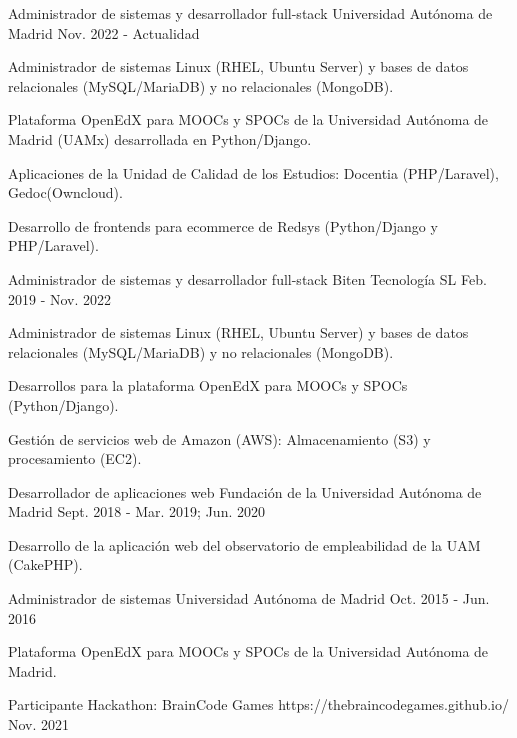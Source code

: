 \begin{cventries}
  \cventry
    {Administrador de sistemas y desarrollador full-stack} %
    {Universidad Autónoma de Madrid} %
    {} %
    {Nov. 2022 - Actualidad} %
    {
      \begin{cvitems} %
        \item{Administrador de sistemas Linux (RHEL, Ubuntu Server) y bases de datos relacionales (MySQL/MariaDB) y no relacionales (MongoDB).}
		\item{Plataforma OpenEdX para MOOCs y SPOCs de la Universidad Autónoma de Madrid (UAMx) desarrollada en Python/Django.}
		\item{Aplicaciones de la Unidad de Calidad de los Estudios: Docentia (PHP/Laravel), Gedoc(Owncloud).}
		\item{Desarrollo de frontends para ecommerce de Redsys (Python/Django y PHP/Laravel).}
      \end{cvitems}
    }

  \cventry
    {Administrador de sistemas y desarrollador full-stack} %
    {Biten Tecnología SL} %
    {} %
    {Feb. 2019 - Nov. 2022} %
    {
    \begin{cvitems}
      \item{Administrador de sistemas Linux (RHEL, Ubuntu Server) y bases de datos relacionales (MySQL/MariaDB) y no relacionales (MongoDB).}
		\item{Desarrollos para la plataforma OpenEdX para MOOCs y SPOCs (Python/Django).}
		\item{Gestión de servicios web de Amazon (AWS): Almacenamiento (S3) y procesamiento (EC2).}
	\end{cvitems}
	}

  \cventry
    {Desarrollador de aplicaciones web} %
    {Fundación de la Universidad Autónoma de Madrid} %
    {} %
    {Sept. 2018 - Mar. 2019; Jun. 2020} %
    {
      \begin{cvitems} %
        \item {Desarrollo de la aplicación web del observatorio de empleabilidad de la UAM (CakePHP).}
      \end{cvitems}
    }

  \cventry
    {Administrador de sistemas} %
    {Universidad Autónoma de Madrid} %
    {} %
    {Oct. 2015 - Jun. 2016} %
    {
      \begin{cvitems} %
        \item {Plataforma OpenEdX para MOOCs y SPOCs de la Universidad Autónoma de Madrid.}
      \end{cvitems}
    }
\end{cventries}

\begin{cventries}
  \cventry
    {Participante} %
    {Hackathon: BrainCode Games} %
    {https://thebraincodegames.github.io/} %
    {Nov. 2021} %
    {}
\end{cventries}